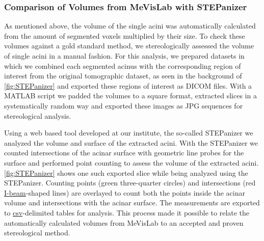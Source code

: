 \documentclass[%
	paper=a4,%
	abstract=true,%
	]{scrartcl}
\begin{document}
\subsubsection{Comparison of Volumes from MeVisLab with STEPanizer}
As mentioned above, the volume of the single acini was automatically calculated from the amount of segmented voxels multiplied by their size. To check these volumes against a gold standard method, we stereologically assessed the volume of single acini in a manual fashion. For this analysis, we prepared datasets in which we combined each segmented acinus with the corresponding region of interest from the original tomographic dataset, as seen in the background of \autoref{fig:STEPanizer} and exported these regions of interest as DICOM files. With a MATLAB script we padded the volumes to a square format, extracted slices in a systematically random way and exported these images as JPG sequences for stereological analysis.

Using a web based tool developed at our institute, the so-called STEPanizer \cite[provided free of charge at \url{http://stepanizer.com}]{Tschanz2011} we analyzed the volume and surface of the extracted acini. With the STEPanizer we counted intersections of the acinar surface with geometric line probes for the surface and performed point counting to assess the volume of the extracted acini. \autoref{fig:STEPanizer} shows one such exported slice while being analyzed using the STEPanizer. Counting points (green three-quarter circles) and intersections (red \href{http://www.dict.cc/englisch-deutsch/I-beam.html}{I-beam}-shaped lines) are overlayed to count both the points inside the acinar volume and intersections with the acinar surface. The measurements are exported to \href{https://secure.wikimedia.org/wikipedia/en/w/index.php?title=Comma-separated_values&oldid=441921632}{csv}-delimited tables for analysis. This process made it possible to relate the automatically calculated volumes from MeVisLab to an accepted and proven stereological method.
\end{document}
